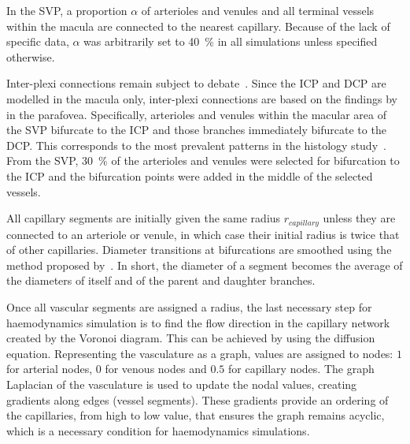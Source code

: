 \documentclass[11pt,]{article}
\begin{document}
In the SVP, a proportion $\alpha$ of arterioles and venules and all terminal vessels within the macula are connected to the nearest capillary. Because of the lack of specific data, $\alpha$ was arbitrarily set to \SI{40}{\percent} in all simulations unless specified otherwise.

Inter-plexi connections remain subject to debate~\cite{An2020,Chiaravalli2022,Campbell2017}.
Since the ICP and DCP are modelled in the macula only, inter-plexi connections are based on the findings by~\cite{An2020} in the parafovea.
Specifically, arterioles and venules within the macular area of the SVP bifurcate to the ICP and those branches immediately bifurcate to the DCP.
This corresponds to the most prevalent patterns in the histology study~\cite{An2020}.
From the SVP, \SI{30}{\percent} of the arterioles and venules were selected for bifurcation to the ICP and the bifurcation points were added in the middle of the selected vessels.

All capillary segments are initially given the same radius $r_{capillary}$ unless they are connected to an arteriole or venule, in which case their initial radius is twice that of other capillaries.
Diameter transitions at bifurcations are smoothed using the method proposed by~\cite{Linninger2013}.
In short, the diameter of a segment becomes the average of the diameters of itself and of the parent and daughter branches.

Once all vascular segments are assigned a radius, the last necessary step for haemodynamics simulation is to find the flow direction in the capillary network created by the Voronoi diagram.
This can be achieved by using the diffusion equation.
Representing the vasculature as a graph, values are assigned to nodes: $1$ for arterial nodes, $0$ for venous nodes and $0.5$ for capillary nodes.
The graph Laplacian of the vasculature is used to update the nodal values, creating gradients along edges (vessel segments).
These gradients provide an ordering of the capillaries, from high to low value, that ensures the graph remains acyclic, which is a necessary condition for haemodynamics simulations.
\end{document}
